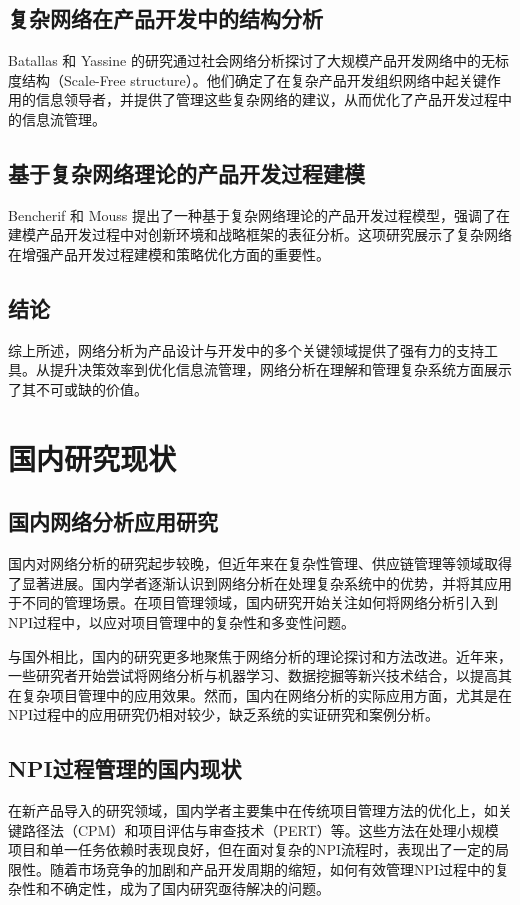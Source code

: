 \subsection{复杂网络在产品开发中的结构分析}
Batallas 和 Yassine 的研究\cite{batallas2006information}通过社会网络分析探讨了大规模产品开发网络中的无标度结构（Scale-Free structure）。他们确定了在复杂产品开发组织网络中起关键作用的信息领导者，并提供了管理这些复杂网络的建议，从而优化了产品开发过程中的信息流管理。

\subsection{基于复杂网络理论的产品开发过程建模}
Bencherif 和 Mouss 提出了一种基于复杂网络理论的产品开发过程模型\cite{bencherif2020complex}，强调了在建模产品开发过程中对创新环境和战略框架的表征分析。这项研究展示了复杂网络在增强产品开发过程建模和策略优化方面的重要性。

\subsection{结论}
综上所述，网络分析为产品设计与开发中的多个关键领域提供了强有力的支持工具。从提升决策效率到优化信息流管理，网络分析在理解和管理复杂系统方面展示了其不可或缺的价值。


\section{国内研究现状}

\subsection{国内网络分析应用研究}
国内对网络分析的研究起步较晚，但近年来在复杂性管理、供应链管理等领域取得了显著进展。国内学者逐渐认识到网络分析在处理复杂系统中的优势，并将其应用于不同的管理场景。在项目管理领域，国内研究开始关注如何将网络分析引入到NPI过程中，以应对项目管理中的复杂性和多变性问题。

与国外相比，国内的研究更多地聚焦于网络分析的理论探讨和方法改进。近年来，一些研究者开始尝试将网络分析与机器学习、数据挖掘等新兴技术结合，以提高其在复杂项目管理中的应用效果。然而，国内在网络分析的实际应用方面，尤其是在NPI过程中的应用研究仍相对较少，缺乏系统的实证研究和案例分析。

\subsection{NPI过程管理的国内现状}
在新产品导入的研究领域，国内学者主要集中在传统项目管理方法的优化上，如关键路径法（CPM）和项目评估与审查技术（PERT）等。这些方法在处理小规模项目和单一任务依赖时表现良好，但在面对复杂的NPI流程时，表现出了一定的局限性。随着市场竞争的加剧和产品开发周期的缩短，如何有效管理NPI过程中的复杂性和不确定性，成为了国内研究亟待解决的问题。

